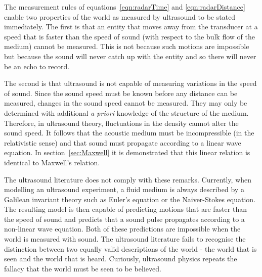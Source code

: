 \documentclass[10pt, fleqn,final,showtrims,oldfontcommands, article,a4paper,oneside]{memoir} %
\newcommand{\secref}[1]{section~\ref{sec:#1}}
\begin{document}
The measurement rules of equations~\ref{eqn:radarTime} and \ref{eqn:radarDistance} enable two properties of the world as measured by ultrasound to be stated immediately.
The first is that an entity that moves away from the transducer at a speed that is faster than the speed of sound (with respect to the bulk flow of the medium) 
cannot be measured.  
This is not because such motions are impossible but because the sound will never catch  up with the entity and so there will never be an echo to record.

The second is that ultrasound is not capable of  measuring variations in the speed of sound.
Since the sound speed must be known before any distance can be measured,
changes in the sound speed  cannot be measured. 
They may only be determined  with additional {\em a priori} knowledge of the structure of the medium. 
Therefore, in ultrasound theory, fluctuations in the density  cannot alter the sound speed. %
It follows that the acoustic medium must be incompressible (in the relativistic sense\cite{Pekeris1976, Pekeris1977, Taub1978})
and that  sound must propagate according to a linear wave equation. %
In \secref{Maxwell} it is demonstrated that this linear relation is identical to Maxwell's relation.

The ultrasound literature does not comply with these remarks.
Currently, when modelling an ultrasound experiment, a fluid medium is always described by a Galilean invariant theory such as Euler's equation or the Naiver-Stokes equation.
The resulting model is then capable of predicting motions that are faster than the speed of sound
and predicts that  a sound pulse  propagates according to  a non-linear wave equation.
Both of these predictions are impossible when the world is measured with sound.
%
The ultrasound literature fails to recognise the distinction between  two equally valid descriptions of the world -
the world that is seen
and the world that is heard.
Curiously, ultrasound physics repeats the   fallacy that  the world must be seen to be believed.
\end{document}
